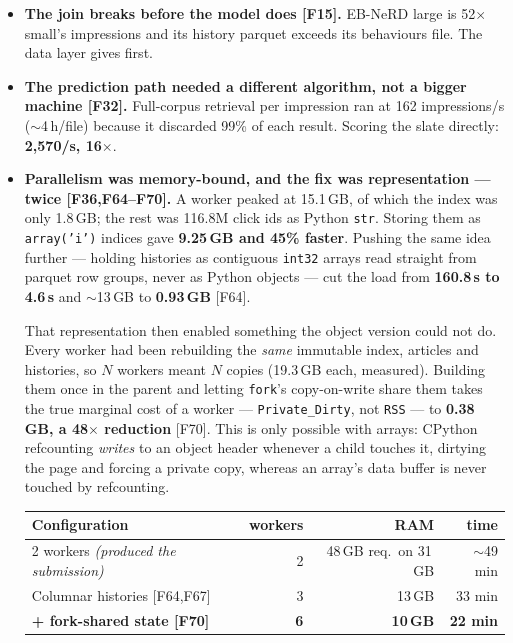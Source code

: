 \documentclass[10pt,a4paper]{article}
\newcommand{\F}[1]{\textcolor{blue!55!black}{\footnotesize[#1]}}
\begin{document}
\begin{itemize}
\item \textbf{The join breaks before the model does \F{F15}.} EB-NeRD large is 52$\times$ small's
impressions and its history parquet exceeds its behaviours file. The data layer gives first.
\item \textbf{The prediction path needed a different algorithm, not a bigger machine \F{F32}.}
Full-corpus retrieval per impression ran at 162 impressions/s ($\sim$4\,h/file) because it discarded
99\% of each result. Scoring the slate directly: \textbf{2,570/s, 16$\times$}.
\item \textbf{Parallelism was memory-bound, and the fix was representation --- twice
\F{F36,F64--F70}.} A worker peaked at 15.1\,GB, of which the index was only 1.8\,GB; the rest was
116.8M click ids as Python \texttt{str}. Storing them as \texttt{array('i')} indices gave
\textbf{9.25\,GB and 45\% faster}. Pushing the same idea further --- holding histories as contiguous
\texttt{int32} arrays read straight from parquet row groups, never as Python objects --- cut the load
from \textbf{160.8\,s to 4.6\,s} and $\sim$13\,GB to \textbf{0.93\,GB} \F{F64}.

That representation then enabled something the object version could not do. Every worker had been
rebuilding the \emph{same} immutable index, articles and histories, so $N$ workers meant $N$ copies
(19.3\,GB each, measured). Building them once in the parent and letting \texttt{fork}'s
copy-on-write share them takes the true marginal cost of a worker --- \texttt{Private\_Dirty}, not
\texttt{RSS} --- to \textbf{0.38\,GB, a 48$\times$ reduction} \F{F70}. This is only possible with
arrays: CPython refcounting \emph{writes} to an object header whenever a child touches it, dirtying
the page and forcing a private copy, whereas an array's data buffer is never touched by refcounting.

\begin{center}\footnotesize
\begin{tabular}{@{}lrrr@{}}
\toprule
Configuration & workers & RAM & time \\
\midrule
2 workers \emph{(produced the submission)} & 2 & 48\,GB req.\ on 31\,GB & $\sim$49 min \\
Columnar histories \F{F64,F67} & 3 & 13\,GB & 33 min \\
\textbf{+ fork-shared state \F{F70}} & \textbf{6} & \textbf{10\,GB} & \textbf{22 min} \\
\bottomrule
\end{tabular}
\end{center}


\end{itemize}
\end{document}
